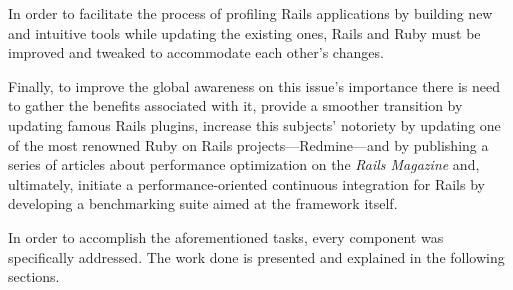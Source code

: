 In order to facilitate the process of profiling Rails applications by building new and intuitive tools while updating the existing ones, Rails and Ruby must be improved and tweaked to accommodate each other's changes.

Finally, to improve the global awareness on this issue's importance there is need to gather the benefits associated with it, provide a smoother transition by updating famous Rails plugins, increase this subjects' notoriety by updating one of the most renowned Ruby on Rails projects---Redmine---and by publishing a series of articles about performance optimization on the \textit{Rails Magazine} and, ultimately, initiate a performance-oriented continuous integration for Rails by developing a benchmarking suite aimed at the framework itself.

In order to accomplish the aforementioned tasks, every component was specifically addressed. The work done is presented and explained in the following sections.







